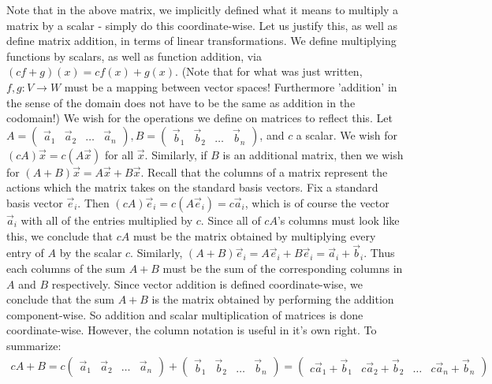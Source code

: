 \documentclass{article}
\theoremstyle{definition}
\theoremstyle{plain}
\theoremstyle{theorem}
\begin{document}
\par Note that in the above matrix, we implicitly defined what it means to multiply a matrix by a scalar - simply do this coordinate-wise. Let us justify this, as well as define matrix addition, in terms of linear transformations. We define multiplying functions by scalars, as well as function addition, via $(cf+g)(x) = cf(x)+g(x)$. (Note that for what was just written, $f,g:V \to W$ must be a mapping between vector spaces! Furthermore 'addition' in the sense of the domain does not have to be the same as addition in the codomain!) We wish for the operations we define on matrices to reflect this. Let $A = \begin{pmatrix} \vec{a}_1 & \vec{a}_2 & \ldots & \vec{a}_n \end{pmatrix}, B=\begin{pmatrix} \vec{b}_1 & \vec{b}_2 & \ldots & \vec{b}_n \end{pmatrix}$, and $c$ a scalar. We wish for $(cA)\vec{x} = c(A\vec{x})$ for all $\vec{x}$. Similarly, if $B$ is an additional matrix, then we wish for $(A+B)\vec{x} = A\vec{x}+B\vec{x}$. Recall that the columns of a matrix represent the actions which the matrix takes on the standard basis vectors. Fix a standard basis vector $\vec{e}_i$. Then $(cA)\vec{e}_i = c(A\vec{e}_i) = c\vec{a}_i$, which is of course the vector $\vec{a}_i$ with all of the entries multiplied by $c$. Since all of $cA$'s columns must look like this, we conclude that $cA$ must be the matrix obtained by multiplying every entry of $A$ by the scalar $c$. Similarly, $(A+B)\vec{e}_i = A\vec{e}_i+B\vec{e}_i = \vec{a}_i+\vec{b}_i$. Thus each columns of the sum $A+B$ must be the sum of the corresponding columns in $A$ and $B$ respectively. Since vector addition is defined coordinate-wise, we conclude that the sum $A+B$ is the matrix obtained by performing the addition component-wise. So addition and scalar multiplication of matrices is done coordinate-wise. However, the column notation is useful in it's own right. To summarize:
\begin{align}
	cA+B = c\begin{pmatrix} \vec{a}_1 & \vec{a}_2 & \ldots & \vec{a}_n \end{pmatrix}+\begin{pmatrix} \vec{b}_1 & \vec{b}_2 & \ldots & \vec{b}_n \end{pmatrix} = \begin{pmatrix} c\vec{a}_1+\vec{b}_1 & c\vec{a}_2+\vec{b}_2 & \ldots & c\vec{a}_n+\vec{b}_n \end{pmatrix}
\end{align} 
\end{document}
